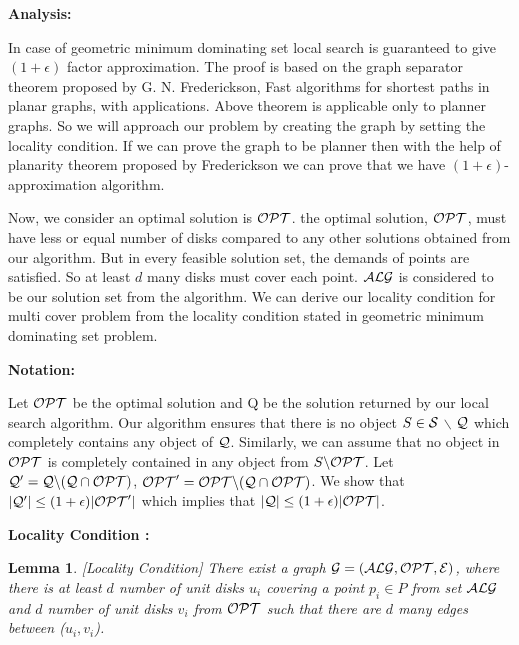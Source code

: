 \documentclass[a4paper,10pt]{article}  %
\newtheorem{lemma}{Lemma}
\begin{document}
	\textbf{Analysis:}
	
	In case of geometric minimum dominating set local search is guaranteed to give $(1+\epsilon)$ factor approximation. The proof is based on the graph separator theorem proposed by G. N. Frederickson, Fast algorithms for shortest paths in planar graphs, with applications\cite{Frederickson87}. Above theorem is applicable only to planner graphs. So we will approach our problem by creating the graph by setting the locality condition. If we can prove the graph to be planner then with the help of planarity theorem proposed by Frederickson we can prove that we have $(1+\epsilon)$- approximation algorithm.
	
	Now, we consider an optimal solution is ${\cal OPT}$. the optimal solution, ${\cal OPT}$, must have less or equal number of disks compared to any other solutions obtained from our algorithm. But in every feasible solution set, the demands of points are satisfied. So at least $d$ many disks must cover each point. ${\cal ALG}$ is considered to be our solution set from the algorithm. We can derive our locality condition for multi cover problem from the locality condition stated in geometric minimum dominating set problem\cite{matt3320}.
	
		
	\textbf{Notation:}
		
	Let ${\cal OPT}$ be the optimal solution and {\cal Q} be the solution returned by our local search algorithm. Our algorithm ensures that there is no object $S \in {\cal S}$ $\backslash$ ${\cal Q}$ which completely contains any object of ${\cal Q}$. Similarly, we can assume that no object in ${\cal OPT}$ is completely contained in any object from $S \backslash {\cal OPT}$. Let ${\cal Q}'={\cal Q} \backslash({\cal Q}\cap{\cal OPT})$, ${\cal OPT}'={\cal OPT} \backslash ({\cal Q}\cap {\cal OPT}) $. We show that $|{\cal Q}'| \leq (1 + \epsilon)|{\cal OPT}'|$ which implies that $|{\cal Q}| \leq (1 + \epsilon)|{\cal OPT} |$.
		
	
	\textbf{Locality Condition :}
	
	\begin{lemma}\label{loca}[Locality Condition]
		There exist a graph ${\cal G} = ({\cal ALG},{\cal OPT},{\cal E})$, where there is at least $d$ number of unit disks $u_i$ covering a point $p_i \in P$ from set ${\cal ALG}$ and $d$ number of unit disks $v_i$ from ${\cal OPT}$ such that there are $d$ many edges between ($u_i,v_i$).
	\end{lemma}
	
	
	
\end{document}
